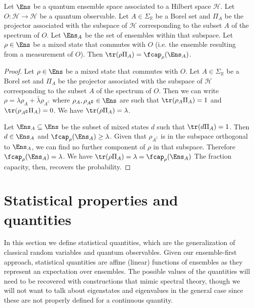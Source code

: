 \begin{mathSection}
	\begin{prop}
		Let $\Ens$ be a quantum ensemble space associated to a Hilbert space $\mathcal{H}$. Let $O : \mathcal{H} \to \mathcal{H}$ be a quantum observable. Let $A \in \Sigma_{\mathbb{R}}$ be a Borel set and $\Pi_{A}$ be the projector associated with the subspace of $\mathcal{H}$ corresponding to the subset $A$ of the spectrum of $O$. Let $\Ens_A$ be the set of ensembles within that subspace. Let $\rho \in \Ens$ be a mixed state that commutes with $O$ (i.e. the ensemble resulting from a measurement of $O$). Then $\tr(\rho \Pi_A) = \fcap_{\rho}(\Ens_A)$.
	\end{prop}
	
	\begin{proof}
		Let $\rho \in \Ens$ be a mixed state that commutes with $O$. Let $A \in \Sigma_{\mathbb{R}}$ be a Borel set and $\Pi_{A}$ be the projector associated with the subspace of $\mathcal{H}$ corresponding to the subset $A$ of the spectrum of $O$. Then we can write $\rho = \lambda \rho_A + \bar{\lambda} \rho_{A^{\complement}}$ where $\rho_A, \rho_{A^{\complement}} \in \Ens$ are such that $\tr(\rho_A \Pi_A) = 1$ and  $\tr(\rho_{A^{\complement}} \Pi_A) = 0$. We have $\tr(\rho \Pi_A) = \lambda$.
		
		Let $\Ens_A \subseteq \Ens$ be the subset of mixed states $d$ such that $\tr(d \Pi_A) = 1$. Then $d \in \Ens_A$ and $\fcap_{\rho}(\Ens_A) \geq \lambda$. Given that $\rho_{A^{\complement}}$ is in the subspace orthogonal to $\Ens_A$, we can find no further component of $\rho$ in that subspace. Therefore $\fcap_{\rho}(\Ens_A) = \lambda$. We have $\tr(\rho \Pi_A) = \lambda = \fcap_{\rho}(\Ens_A)$ The fraction capacity, then, recovers the probability.
	\end{proof}
\end{mathSection}

\section{Statistical properties and quantities}

In this section we define statistical quantities, which are the generalization of classical random variables and quantum observables. Given our ensemble-first approach, statistical quantities are affine (linear) functions of ensembles as they represent an expectation over ensembles. The possible values of the quantities will need to be recovered with constructions that mimic spectral theory, though we will not want to talk about eigenstates and eigenvalues in the general case since these are not properly defined for a continuous quantity.

